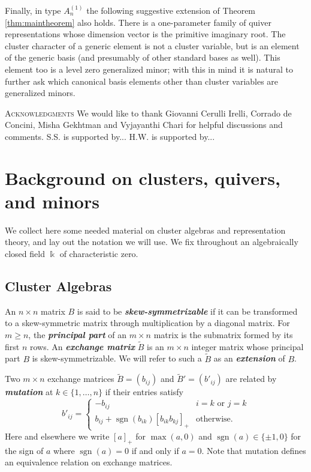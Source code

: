 \documentclass[12pt]{amsart}
\newcommand{\newword}[1]{\textbf{\emph{#1}}}
\newcommand{\kk}{\Bbbk}%
\newcommand{\sgn}{\operatorname{sgn}}
\theoremstyle{remark}
\numberwithin{equation}{section}
\numberwithin{figure}{section}
\begin{document}
Finally, in type $A_n^{\!(1)}$ the following suggestive extension of Theorem \ref{thm:maintheorem} also holds. There is a one-parameter family of quiver representations whose dimension vector is the primitive imaginary root. The cluster character of a generic element is not a cluster variable, but is an element of the generic basis (and presumably of other standard bases as well). This element too is a level zero generalized minor; with this in mind it is natural to further ask which canonical basis elements other than cluster variables are generalized minors.

\textsc{Acknowledgments}  We would like to thank Giovanni Cerulli Irelli, Corrado de Concini, Misha Gekhtman and Vyjayanthi Chari for helpful discussions and comments. S.S. is supported by... H.W. is supported by...

\section{Background on clusters, quivers, and minors}

We collect here some needed material on cluster algebras and representation theory, and lay out the notation we will use.  
We fix throughout an algebraically closed field $\kk$ of characteristic zero. 

\subsection{Cluster Algebras}
An $n\times n$ matrix $B$ is said to be \newword{skew-symmetrizable} if it can be transformed to a skew-symmetric matrix through multiplication by a diagonal matrix. 
For $m \geq n$, the \newword{principal part} of an $m \times n$ matrix is the submatrix formed by its first $n$ rows. 
An \newword{exchange matrix} $\widetilde B$ is an $m\times n$ integer matrix %
whose principal part $B$ is skew-symmetrizable. 
We will refer to such a $\widetilde B$ as an \newword{extension} of $B$.

Two $m\times n$ exchange matrices $\widetilde B=(b_{ij})$ and $\widetilde B'=(b'_{ij})$ are related by \newword{mutation} at $k \in \{1,\dotsc,n\}$ if their entries satisfy 
\begin{equation}\label{eq:matrix mutation}
  b'_{ij} = \begin{cases}
  -b_{ij} & i = k \text{ or } j = k\\
  b_{ij} + \sgn(b_{ik})[b_{ik}b_{kj}]_+ & \text{otherwise.}
  \end{cases}
\end{equation}
Here and elsewhere we write $[a]_+$ for $\max(a,0)$ and $\sgn(a) \in \{\pm 1,0\}$ for the sign of $a$ where $\sgn(a)=0$ if and only if $a=0$. 
Note that mutation defines an equivalence relation on exchange matrices.
\end{document}

